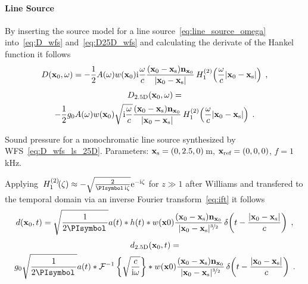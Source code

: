 \paragraph{Line Source}
%
%
By inserting the source model for a line source~\eqref{eq:line_source_omega}
into~\eqref{eq:D_wfs} and~\eqref{eq:D25D_wfs} and calculating the derivate of
the Hankel function\autocite[][(9.1.30)]{Abramowitz1972} it follows
%
\begin{equation}
    D(\x_0,\omega) = -\frac{1}{2}A(\omega) w(\x_0) \I\omegac
    \frac{(\x_0-\xs)\n_{\x_0}}{|\x_0-\xs|}
    \H{1}{2}\left(\omegac|\x_0-\xs|\right) \qc
    \label{eq:D_wfs_ls}
\end{equation}
%
\begin{multline}
    D_\twohalfD(\x_0,\omega) = \\
    -\frac{1}{2}g_0 A(\omega) w(\x_0) \sqrt{\I\omegac}
    \frac{(\x_0-\xs)\n_{\x_0}}{|\x_0-\xs|}
    \H{1}{2}\left(\omegac|\x_0-\xs|\right) \qp
    \label{eq:D_wfs_ls_25D}
\end{multline}
%
\begin{marginfigure}
    \centering
    \ft
    
    \caption{Sound pressure for a monochromatic line source synthesized by
        \twohalfD \ac{WFS}~\eqref{eq:D_wfs_ls_25D}. Parameters: $\mathbf{x}_\text{s} = (0,2.5,0)$\,m,
        $\mathbf{x}_\text{ref} = (0,0,0)$, $f = 1$\,kHz.
        }
\end{marginfigure}
%
Applying $\H{1}{2}(\zeta) \approx -\sqrt{\frac{2}{\PI \I\zeta}} \E^{-\I\zeta}$ for $z\gg1$ after
Williams and transfered to the
temporal domain via an inverse Fourier
transform~\eqref{eq:ift} it follows
%
\begin{equation}
    d(\x_0,t) = \sqrt{\frac{1}{2\PI}} a(t) * h(t) *
    w(\x0) \frac{(\x_0-\xs)\n_{\x_0}}{|\x_0-\xs|^{\nicefrac{3}{2}}}
    \deltafunc{t-\frac{|\x_0-\xs|}{c}} \qc
    \label{eq:d_wfs_ls}
\end{equation}
%
\begin{multline}
    d_\twohalfD(\x_0,t) = \\
    g_0 \sqrt{\frac{1}{2\PI}} a(t) *
    \IFT{\sqrt{\frac{c}{\I\omega}}} * w(\x0)
    \frac{(\x_0-\xs)\n_{\x_0}}{|\x_0-\xs|^{\nicefrac{3}{2}}}
    \deltafunc{t-\frac{|\x_0-\xs|}{c}} \qp
    \label{eq:d_wfs_ls_25D}
\end{multline}
